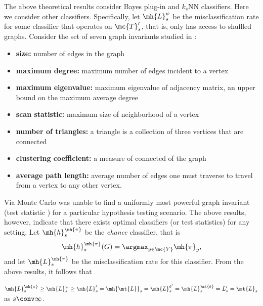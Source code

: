 \documentclass[10pt,journal,cspaper,compsoc]{IEEEtran}
\begin{document}

The above theoretical results consider Bayes plug-in and $k_s$NN classifiers. Here we consider other classifiers.  Specifically,  let $\mh{L}^{\psi}_s$ be the misclassification rate for some classifier that operates on $\mc{T}_s'$, that is, only has access to shuffled graphs.  Consider the set of seven graph invariants studied in \cite{PCP10}:
\begin{itemize}
	\item \textbf{size:} number of edges in the graph
	\item \textbf{maximum degree:} maximum number of edges incident to a vertex
	\item \textbf{maximum eigenvalue:} maximum eigenvalue of adjacency matrix, an upper bound on the maximum average degree
	\item \textbf{scan statistic:} maximum size of neighborhood of a vertex
	\item \textbf{number of triangles:} a triangle is a collection of three vertices that are connected
	\item \textbf{clustering coefficient:} a measure of connected of the graph
	\item \textbf{average path length:} average number of edges one must traverse to travel from a vertex to any other vertex.
\end{itemize}
Via Monte Carlo \cite{PCP10} was unable to find a uniformly most powerful graph invariant (test statistic \cite{PCR10}) for a particular hypothesis testing scenario.  The above results, however, indicate that there exists optimal classifiers (or test statistics) for any setting.  %
Let $\mh{h}^{\mh{\pi}}_s$ be the \emph{chance} classifier, that is
\begin{align}
	\mh{h}_s^{\mh{\pi}}(G)=\argmax_{y\in\mc{Y}} \mh{\pi}_y,
\end{align}
and let $\mh{L}^{\mh{\pi}}_s$ be the misclassification rate for this classifier.  From the above results, it follows that
\begin{thm} \label{thm:knninadmiss2}
	$\mh{L}^{\mh{\pi}}_s \geq \mh{L}^{\psi}_s \geq \mh{L}_s'=\mh{\mt{L}}_s = \mh{L}^{\delta'}_s=\mh{L}^{\mt{\delta}}_s=L_s'=\mt{L}_s$ as $s \conv \infty$. 
\end{thm}
\end{document}
